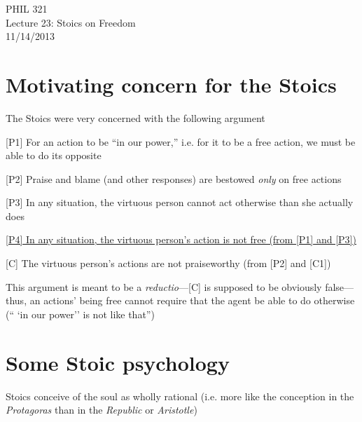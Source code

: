 \documentclass[11pt]{article}
\begin{document}
\thispagestyle{empty}
\begin{center} \LARGE{PHIL 321\\ Lecture 23: Stoics on Freedom}\\ \vspace*{2mm}
\large{11/14/2013}\end{center}
\thispagestyle{empty}\vspace*{3mm}
\vspace*{-8mm}

\section*{Motivating concern for the Stoics}

\noindent The Stoics were very concerned with the following argument
\vspace*{2mm}

[P1] For an action to be ``in our power,'' i.e. for it to be a free action, we must be able to do its opposite\vspace*{1mm}

[P2] Praise and blame (and other responses) are bestowed \emph{only} on free actions
\vspace*{1mm}

[P3] In any situation, the virtuous person cannot act otherwise than she actually does
\vspace*{1mm}

\underline{[P4] In any situation, the virtuous person's action is not free (from [P1] and [P3])}
\vspace*{1mm}

[C] The virtuous person's actions are not praiseworthy (from [P2] and [C1])
\vspace*{2mm}

\noindent This argument is meant to be a \emph{reductio}---[C] is supposed to be obviously false---thus, an actions' being free cannot require that the agent be able to do otherwise (`` `in our power'' is not like that'')

\section*{Some Stoic psychology}

\noindent Stoics conceive of the soul as wholly rational (i.e. more like the conception in the \emph{Protagoras} than in the \emph{Republic} or \emph{Aristotle})
\vspace*{2mm}
\end{document}
